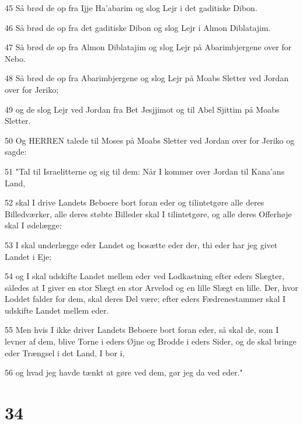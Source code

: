 \par 45 Så brød de op fra Ijje Ha'abarim og slog Lejr i det gaditiske Dibon.
\par 46 Så brød de op fra det gaditiske Dibon og slog Lejr i Almon Diblatajim.
\par 47 Så brød de op fra Almon Diblatajim og slog Lejr på Abarimbjergene over for Nebo.
\par 48 Så brød de op fra Abarimbjergene og slog Lejr på Moabs Sletter ved Jordan over for Jeriko;
\par 49 og de slog Lejr ved Jordan fra Bet Jesjjimot og til Abel Sjittim på Moabs Sletter.
\par 50 Og HERREN talede til Moses på Moabs Sletter ved Jordan over for Jeriko og sagde:
\par 51 "Tal til Israelitterne og sig til dem: Når I kommer over Jordan til Kana'ans Land,
\par 52 skal I drive Landets Beboere bort foran eder og tilintetgøre alle deres Billedværker, alle deres støbte Billeder skal I tilintetgøre, og alle deres Offerhøje skal I ødelægge;
\par 53 I skal underlægge eder Landet og bosætte eder der, thi eder har jeg givet Landet i Eje;
\par 54 og I skal udskifte Landet mellem eder ved Lodkastning efter eders Slægter, således at I giver en stor Slægt en stor Arvelod og en lille Slægt en lille. Der, hvor Loddet falder for dem, skal deres Del være; efter eders Fædrenestammer skal I udskifte Landet mellem eder.
\par 55 Men hvis I ikke driver Landets Beboere bort foran eder, så skal de, som I levner af dem, blive Torne i eders Øjne og Brodde i eders Sider, og de skal bringe eder Trængsel i det Land, I bor i,
\par 56 og hvad jeg havde tænkt at gøre ved dem, gør jeg da ved eder."

\chapter{34}

